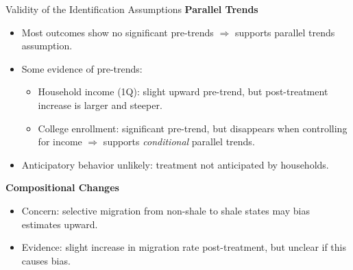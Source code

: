 \documentclass[aspectratio=169,xcolor=dvipsnames]{beamer}
\begin{document}
\begin{frame}{Validity of the Identification Assumptions}
\textbf{Parallel Trends}
\begin{itemize}
  \item Most outcomes show no significant pre-trends $\Rightarrow$ supports parallel trends assumption.
  \item Some evidence of pre-trends:
    \begin{itemize}
      \item Household income (1Q): slight upward pre-trend, but post-treatment increase is larger and steeper.
      \item College enrollment: significant pre-trend, but disappears when controlling for income $\Rightarrow$ supports \textit{conditional} parallel trends.
    \end{itemize}
  \item Anticipatory behavior unlikely: treatment not anticipated by households.
\end{itemize}

\vspace{0.2cm}
\textbf{Compositional Changes}
\begin{itemize}
  \item Concern: selective migration from non-shale to shale states may bias estimates upward.
  \item Evidence: slight increase in migration rate post-treatment, but unclear if this causes bias.
\end{itemize}

\end{frame}
\end{document}
